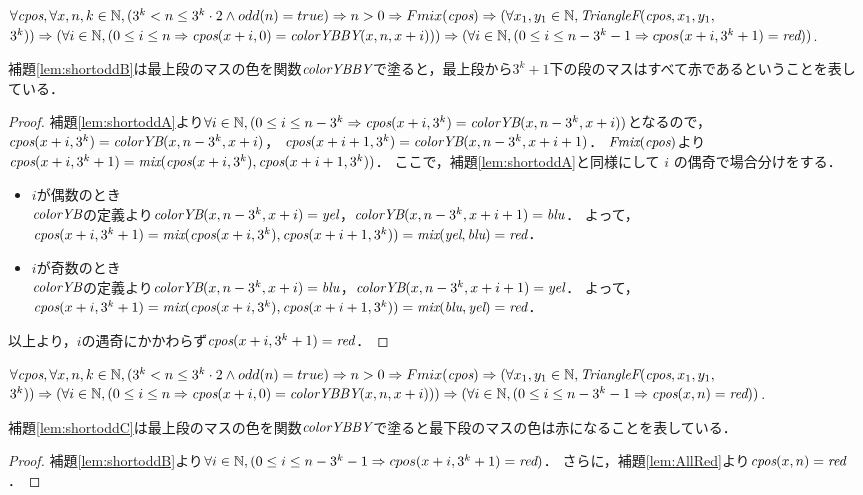 \begin{lem}[\ShortOddB] \label{lem:shortoddB}
  $\forall \textit{cpos}, \forall x, n, k \in \mathbb{N},
  (3^k < n \leq 3^k \cdot 2 \land odd(n) = true) \Rightarrow
  n > 0  \Rightarrow Fmix(\textit{cpos}) \Rightarrow 
  (\forall x_1, y_1 \in \mathbb{N}, \textit{TriangleF}(\textit{cpos},x_1,y_1,$ $3^k)) \Rightarrow
  (\forall i \in \mathbb{N}, (0 \leq i \leq n \Rightarrow \textit{cpos}(x+i,0) = \textit{colorYBBY}(x,n,x+i))) \Rightarrow
  (\forall i \in \mathbb{N}, (0 \leq i \leq n - 3^k-1 \Rightarrow cpos(x+i,3^k+1)= \textit{red}))$.
\end{lem}
補題\ref{lem:shortoddB}は最上段のマスの色を関数$\textit{colorYBBY}$で塗ると，最上段から$3^k+1$下の段のマスはすべて赤であるということを表している．
\begin{proof}
  補題\ref{lem:shortoddA}より$\forall i \in \mathbb{N}, (0 \leq i \leq n - 3^k \Rightarrow \textit{cpos}(x+i,3^k) = \textit{colorYB}(x,n-3^k,x+i))$となるので，
  $\textit{cpos}(x+i,3^k) = \textit{colorYB}(x,n-3^k,x+i)$，
  $\textit{cpos}(x+i+1,3^k) = \textit{colorYB}(x,n-3^k,x+i+1)$．
  $\textit{Fmix}(\textit{cpos})$より$\textit{cpos}(x+i,3^k+1) = \textit{mix}(\textit{cpos}(x+i,3^k),\textit{cpos}(x+i+1,3^k))$．
  ここで，補題\ref{lem:shortoddA}と同様にして $i$ の偶奇で場合分けをする．
  \begin{itemize}
  \item
    $i$が偶数のとき \\
    $\textit{colorYB}$の定義より$\textit{colorYB}(x,n-3^k,x+i)=\textit{yel}$，$\textit{colorYB}(x,n-3^k,x+i+1)=\textit{blu}$．
    よって，$\textit{cpos}(x+i,3^k+1)=\textit{mix}(\textit{cpos}(x+i,3^k),\textit{cpos}(x+i+1,3^k))=\textit{mix}(\textit{yel},\textit{blu})=\textit{red}$．
  \item
    $i$が奇数のとき \\
    $\textit{colorYB}$の定義より$\textit{colorYB}(x,n-3^k,x+i)=\textit{blu}$，$\textit{colorYB}(x,n-3^k,x+i+1)=\textit{yel}$．
    よって，$\textit{cpos}(x+i,3^k+1)=\textit{mix}(\textit{cpos}(x+i,3^k),\textit{cpos}(x+i+1,3^k))=\textit{mix}(\textit{blu},\textit{yel})=\textit{red}$．
  \end{itemize}
  以上より，$i$の遇奇にかかわらず$\textit{cpos}(x+i,3^k+1) = \textit{red}$．
\end{proof}

\begin{lem}[\ShortOddC] \label{lem:shortoddC}
  $\forall \textit{cpos}, \forall x, n, k \in \mathbb{N},
  (3^k < n \leq 3^k \cdot 2 \land odd(n) = true) \Rightarrow
  n > 0  \Rightarrow Fmix(\textit{cpos}) \Rightarrow 
  (\forall x_1, y_1 \in \mathbb{N}, \textit{TriangleF}(\textit{cpos},x_1,y_1,$ $3^k)) \Rightarrow
  (\forall i \in \mathbb{N}, (0 \leq i \leq n \Rightarrow \textit{cpos}(x+i,0) = \textit{colorYBBY}(x,n,x+i))) \Rightarrow
  (\forall i \in \mathbb{N}, (0 \leq i \leq n - 3^k-1 \Rightarrow \textit{cpos}(x,n)= \textit{red}))$.
\end{lem}
補題\ref{lem:shortoddC}は最上段のマスの色を関数$\textit{colorYBBY}$で塗ると最下段のマスの色は赤になることを表している．
\begin{proof}
  補題\ref{lem:shortoddB}より$\forall i \in \mathbb{N}, (0 \leq i \leq n - 3^k-1 \Rightarrow cpos(x+i,3^k+1)= \textit{red})$．
  さらに，補題\ref{lem:AllRed}より$\textit{cpos}(x,n)=\textit{red}$．
\end{proof}

